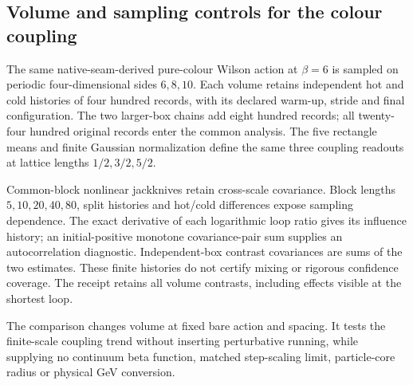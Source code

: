 \subsection{Volume and sampling controls for the colour coupling}

The same native-seam-derived pure-colour Wilson action at $\beta=6$
is sampled on periodic four-dimensional sides $6,8,10$. Each volume
retains independent hot and cold histories of four hundred records, with
its declared warm-up, stride and final configuration. The two larger-box
chains add eight hundred records; all twenty-four hundred original
records enter the common analysis. The five rectangle means and finite
Gaussian normalization define the same three coupling readouts at lattice
lengths $1/2,3/2,5/2$.

Common-block nonlinear jackknives retain cross-scale covariance. Block
lengths $5,10,20,40,80$, split histories and hot/cold differences expose
sampling dependence. The exact derivative of each logarithmic loop ratio
gives its influence history; an initial-positive monotone covariance-pair
sum supplies an autocorrelation diagnostic. Independent-box contrast
covariances are sums of the two estimates. These finite histories do not
certify mixing or rigorous confidence coverage. The receipt retains all
volume contrasts, including effects visible at the shortest loop.

The comparison changes volume at fixed bare action and spacing. It tests
the finite-scale coupling trend without inserting perturbative running,
while supplying no continuum beta function, matched step-scaling limit,
particle-core radius or physical GeV conversion.
